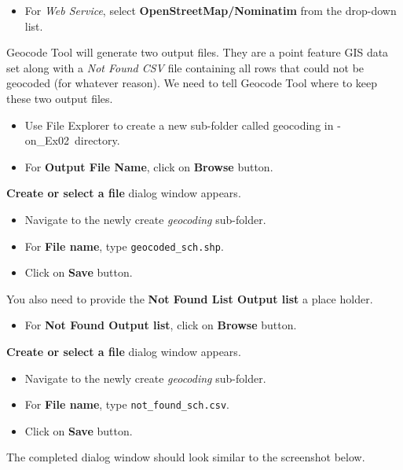 \documentclass[
  letterpaper,
  DIV=11,
  numbers=noendperiod]{scrreprt}
\providecommand{\tightlist}{%
  \setlength{\itemsep}{0pt}\setlength{\parskip}{0pt}}\usepackage{longtable,booktabs,array}
\begin{document}
\begin{itemize}
\tightlist
\item
  For \emph{Web Service}, select \textbf{OpenStreetMap/Nominatim} from
  the drop-down list.
\end{itemize}

Geocode Tool will generate two output files. They are a point feature
GIS data set along with a \emph{Not Found CSV} file containing all rows
that could not be geocoded (for whatever reason). We need to tell
Geocode Tool where to keep these two output files.

\begin{itemize}
\tightlist
\item
  Use File Explorer to create a new sub-folder called geocoding in
  \Hands-on\_Ex02\data~directory.
\item
  For \textbf{Output File Name}, click on \textbf{Browse} button.
\end{itemize}

\textbf{Create or select a file} dialog window appears.

\begin{itemize}
\tightlist
\item
  Navigate to the newly create \emph{geocoding} sub-folder.
\item
  For \textbf{File name}, type \texttt{geocoded\_sch.shp}.
\item
  Click on \textbf{Save} button.
\end{itemize}

You also need to provide the \textbf{Not Found List Output list} a place
holder.

\begin{itemize}
\tightlist
\item
  For \textbf{Not Found Output list}, click on \textbf{Browse} button.
\end{itemize}

\textbf{Create or select a file} dialog window appears.

\begin{itemize}
\tightlist
\item
  Navigate to the newly create \emph{geocoding} sub-folder.
\item
  For \textbf{File name}, type \texttt{not\_found\_sch.csv}.
\item
  Click on \textbf{Save} button.
\end{itemize}

The completed dialog window should look similar to the screenshot below.
\end{document}
